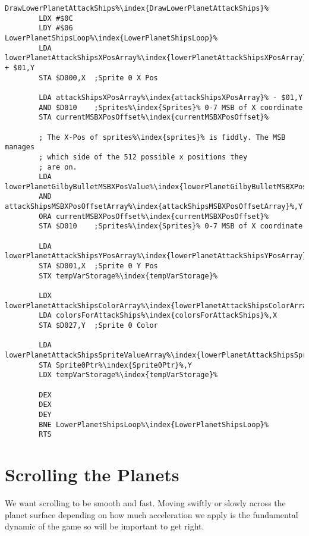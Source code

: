 \begin{minipage}[b]{0.55\linewidth}
\centering
\begin{lstlisting}[basicstyle=\tiny,escapechar=\%]
DrawLowerPlanetAttackShips%\index{DrawLowerPlanetAttackShips}%
        LDX #$0C
        LDY #$06
LowerPlanetShipsLoop%\index{LowerPlanetShipsLoop}%   
        LDA lowerPlanetAttackShipsXPosArray%\index{lowerPlanetAttackShipsXPosArray}% + $01,Y
        STA $D000,X  ;Sprite 0 X Pos

        LDA attackShipsXPosArray%\index{attackShipsXPosArray}% - $01,Y
        AND $D010    ;Sprites%\index{Sprites}% 0-7 MSB of X coordinate
        STA currentMSBXPosOffset%\index{currentMSBXPosOffset}%

        ; The X-Pos of sprites%\index{sprites}% is fiddly. The MSB manages
        ; which side of the 512 possible x positions they
        ; are on.
        LDA lowerPlanetGilbyBulletMSBXPosValue%\index{lowerPlanetGilbyBulletMSBXPosValue}%,Y
        AND attackShipsMSBXPosOffsetArray%\index{attackShipsMSBXPosOffsetArray}%,Y
        ORA currentMSBXPosOffset%\index{currentMSBXPosOffset}%
        STA $D010    ;Sprites%\index{Sprites}% 0-7 MSB of X coordinate

        LDA lowerPlanetAttackShipsYPosArray%\index{lowerPlanetAttackShipsYPosArray}%,Y
        STA $D001,X  ;Sprite 0 Y Pos
        STX tempVarStorage%\index{tempVarStorage}%

        LDX lowerPlanetAttackShipsColorArray%\index{lowerPlanetAttackShipsColorArray}%,Y
        LDA colorsForAttackShips%\index{colorsForAttackShips}%,X
        STA $D027,Y  ;Sprite 0 Color

        LDA lowerPlanetAttackShipsSpriteValueArray%\index{lowerPlanetAttackShipsSpriteValueArray}%,Y
        STA Sprite0Ptr%\index{Sprite0Ptr}%,Y
        LDX tempVarStorage%\index{tempVarStorage}%

        DEX
        DEX
        DEY
        BNE LowerPlanetShipsLoop%\index{LowerPlanetShipsLoop}%
        RTS
\end{lstlisting}
\end{minipage}

\section{Scrolling the Planets}
We want scrolling to be smooth and fast. Moving swiftly or slowly across the planet surface
depending on how much acceleration we apply is the fundamental dynamic of the game so will
be important to get right.

